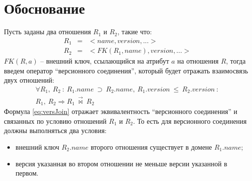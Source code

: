 \section{Обоснование}
\indent Пусть заданы два отношения $R_1$ и $R_2$, такие что:
\begin{eqnarray*}
	R_1 & = & <name, version, ...> \\
	R_2 & = & <FK(R_1, name), version, ...>
\end{eqnarray*}
\indent $FK(R, a)$ -- внешний ключ, ссылающийся на атрибут $a$ на отношения $R$, тогда введем оператор ``версионного соединения'', который будет отражать взаимосвязь двух отношений:
\begin{multline}
	\label{eq:versJoin}
	\forall R_1,\ R_2\ :\ R_1.name\ \supset\ R_2.name,\ R_1.version\ \leq\ R_2.version\ :\\
	R_1,\ R_2 \Rightarrow R_1\ \overrightarrow{\bowtie}\ R_2\
\end{multline}
\indent Формула \ref{eq:versJoin} отражает эквивалентность ``версионного соединения'' и связанных по условию отношений $R_1$ и $R_2$.
То есть для версионного соединения должны выполняться два условия:
\begin{itemize}
	\item внешний ключ $R_2.name$ второго отношения существует в домене $R_1.name$;
	\item версия указанная во втором отношении не меньше версии указанной в первом.
\end{itemize}

